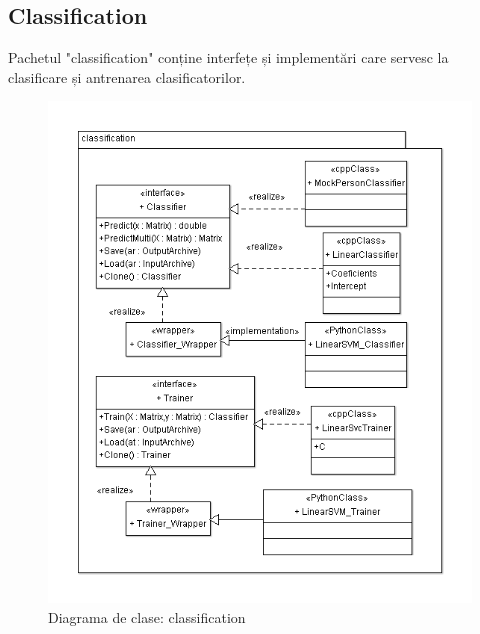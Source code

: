 \subsection{Classification}
Pachetul "classification" conține interfețe și implementări care servesc la clasificare și antrenarea clasificatorilor.
\begin{figure}[H]
	\centering
	\includegraphics[width=1.00\textwidth]{uml/classificationClassDiagram.png}
	\caption{Diagrama de clase: classification}
	\label{fig:classificationClassDiagram}
\end{figure}

